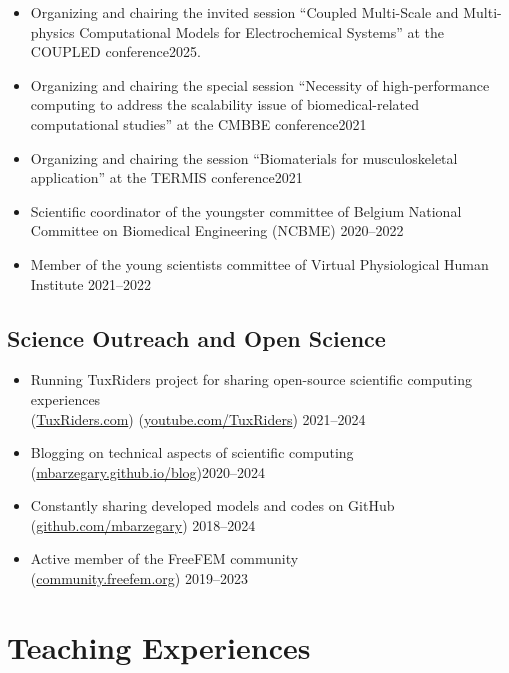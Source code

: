 \documentclass{cv}
\begin{document}
\begin{itemize}[itemsep=-0.2ex]
\item
Organizing and chairing the invited session ``Coupled Multi-Scale and Multi-physics Computational Models for Electrochemical Systems'' at the COUPLED conference\hfill 2025.
\item
Organizing and chairing the special session  ``Necessity of high-performance computing to address the scalability issue of biomedical-related computational studies'' at the CMBBE conference\hfill 2021
\item
Organizing and chairing the session  ``Biomaterials for musculoskeletal application'' at the TERMIS conference\hfill 2021
\item
Scientific coordinator of the youngster committee of Belgium National Committee on Biomedical Engineering (NCBME) \hfill 2020--2022
\item
Member of the young scientists committee of Virtual Physiological Human Institute \hfill 2021--2022
\end{itemize}

\subsection{Science Outreach and Open Science}

\begin{itemize}[itemsep=-0.2ex]
\item
Running TuxRiders project for sharing open-source scientific computing experiences \\
(\href{http://www.tuxriders.com/}{TuxRiders.com}) (\href{https://www.youtube.com/TuxRiders}{youtube.com/TuxRiders}) \hfill 2021--2024
\item
Blogging on technical aspects of scientific computing \\(\href{https://mbarzegary.github.io/blog}{mbarzegary.github.io/blog})\hfill 2020--2024
\item
Constantly sharing developed models and codes on GitHub \\(\href{https://github.com/mbarzegary}{github.com/mbarzegary}) \hfill 2018--2024
\item
Active member of the FreeFEM community\\(\href{https://community.freefem.org/}{community.freefem.org}) \hfill 2019--2023
\end{itemize}


\section{Teaching Experiences}
\end{document}
